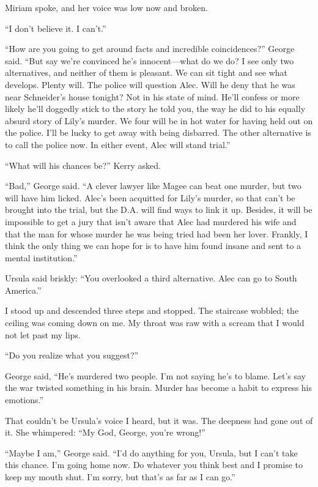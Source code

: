 \documentclass{novel}
\begin{document}
Miriam spoke, and her voice was low now and broken. 

“I don’t believe it. I can’t.”

“How are you going to get around facts and incredible coincidences?” George said. “But say we’re convinced he’s innocent—what do we do? I see only two alternatives, and neither of them is pleasant. We can sit tight and see what develops. Plenty will. The police will question Alec. Will he deny that he was near Schneider’s house tonight? Not in his state of mind. He’ll confess or more likely he’ll doggedly stick to the story he told you, the way he did to his equally absurd story of Lily’s murder. We four will be in hot water for having held out on the police. I’ll be lucky to get away with being disbarred. The other alternative is to call the police now. In either event, Alec will stand trial.”

“What will his chances be?” Kerry asked.

“Bad,” George said. “A clever lawyer like Magee can beat one murder, but two will have him licked. Alec’s been acquitted for Lily’s murder, so that can’t be brought into the trial, but the D.A. will find ways to link it up. Besides, it will be impossible to get a jury that isn’t aware that Alec had murdered his wife and that the man for whose murder he was being tried had been her lover. Frankly, I think the only thing we can hope for is to have him found insane and sent to a mental institution.”

Ursula said briskly: “You overlooked a third alternative. Alec can go to South America.”

\scenestars

I stood up and descended three steps and stopped. The staircase wobbled; the ceiling was coming down on me. My throat was raw with a scream that I would not let past my lips.

“Do you realize what you suggest?”

George said, “He’s murdered two people. I’m not saying he’s to blame. Let’s say the war twisted something in his brain. Murder has become a habit to express his emotions.”

That couldn’t be Ursula’s voice I heard, but it was. The deepness had gone out of it. She whimpered: “My God, George, you’re wrong!”

“Maybe I am,” George said. “I’d do anything for you, Ursula, but I can’t take this chance. I’m going home now. Do whatever you think best and I promise to keep my mouth shut. I’m sorry, but that’s as far as I can go.”
\end{document}

